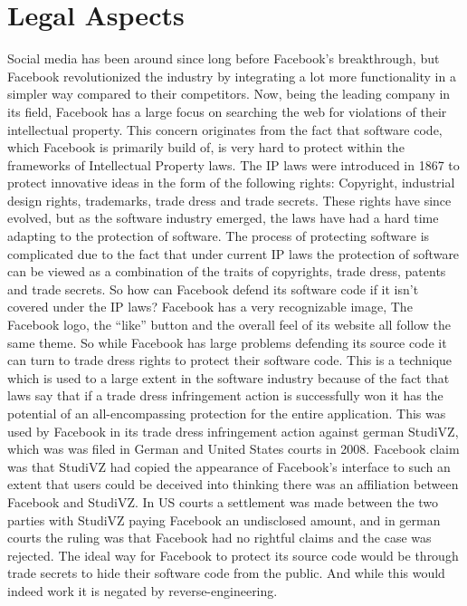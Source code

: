 \documentclass[conference]{IEEEtran}
\begin{document}
\section{Legal Aspects}
\label{legal}

Social media has been around since long before Facebook’s breakthrough, but
Facebook revolutionized the industry by integrating a lot more functionality in
a simpler way compared to their competitors. Now, being the leading company in
its field, Facebook has a large focus on searching the web for violations of
their intellectual property. This concern originates from the fact that
software code, which Facebook is primarily build of, is very hard to protect
within the frameworks of Intellectual Property laws. The IP laws were
introduced in 1867 to protect innovative ideas in the form of the following
rights: Copyright, industrial design rights, trademarks, trade dress and trade
secrets. These rights have since evolved, but as the software industry emerged,
the laws have had a hard time adapting to the protection of software. The
process of protecting software is complicated due to the fact that under
current IP laws the protection of software can be viewed as a combination of
the traits of copyrights, trade dress, patents and trade secrets.  So how can
Facebook defend its software code if it isn’t covered under the IP laws?
Facebook has a very recognizable image, The Facebook logo, the “like” button
and the overall feel of its website all follow the same theme. So while
Facebook has large problems defending its source code it can turn to trade
dress rights to protect their software code. This is a technique which is used
to a large extent in the software industry because of the fact that laws say
that if a trade dress infringement action is successfully won it has the
potential of an all-encompassing protection for the entire application. This
was used by Facebook in its trade dress infringement action against  german
StudiVZ, which was was filed in German and United States courts in 2008.
Facebook claim was that StudiVZ had copied the appearance of Facebook’s
interface to such an extent that users could be deceived into thinking there
was an affiliation between Facebook and StudiVZ. In US courts a settlement was
made between the two parties with StudiVZ paying Facebook an undisclosed
amount, and in german courts the ruling was that Facebook had no rightful
claims and the case was rejected.  The ideal way for Facebook to protect its
source code would be through trade secrets to hide their software code from the
public. And while this would indeed work it is negated by reverse-engineering.
\end{document}
